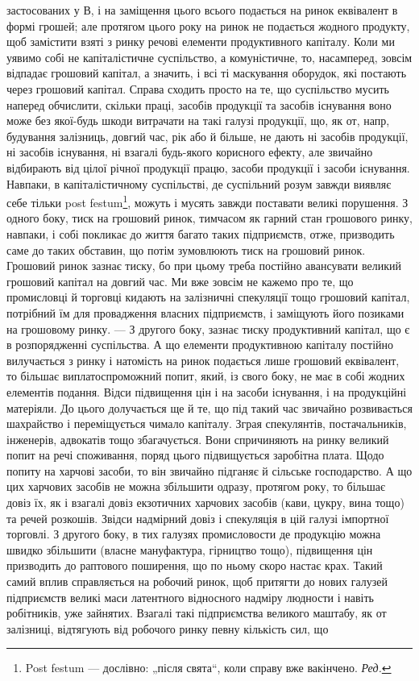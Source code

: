 \parcont{}  %
застосованих у В, і на заміщення цього всього подається на ринок еквівалент
в формі грошей; але протягом цього року на ринок не подається
жодного продукту, щоб замістити взяті з ринку речові елементи продуктивного
капіталу. Коли ми уявимо собі не капіталістичне суспільство,
а комуністичне, то, насамперед, зовсім відпадає грошовий капітал, а значить,
і всі ті маскування оборудок, які постають через грошовий капітал.
Справа сходить просто на те, що суспільство мусить наперед обчислити,
скільки праці, засобів продукції та засобів існування воно може без якої-будь
шкоди витрачати на такі галузі продукції, що, як от, напр, будування
залізниць, довгий час, рік або й більше, не дають ні засобів
продукції, ні засобів існування, ні взагалі будь-якого корисного ефекту,
але звичайно відбирають від цілої річної продукції працю, засоби продукції
і засоби існування. Навпаки, в капіталістичному суспільстві, де
суспільний розум завжди виявляє себе тільки post festum\footnote*{
Post festum — дослівно: „після свята“, коли справу вже вакінчено. \emph{Ред.}
}, можуть і мусять
завжди поставати великі порушення. З одного боку, тиск на грошовий
ринок, тимчасом як гарний стан грошового ринку, навпаки, і собі покликає
до життя багато таких підприємств, отже, призводить саме до таких обставин,
що потім зумовлюють тиск на грошовий ринок. Грошовий ринок
зазнає тиску, бо при цьому треба постійно авансувати великий грошовий
капітал на довгий час. Ми вже зовсім не кажемо про те, що промисловці
й торговці кидають на залізничні спекуляції тощо грошовий капітал,
потрібний їм для провадження власних підприємств, і заміщують його позиками
на грошовому ринку. — З другого боку, зазнає тиску продуктивний капітал,
що є в розпорядженні суспільства. А що елементи продуктивною капіталу
постійно вилучається з ринку і натомість на ринок подається лише
грошовий еквівалент, то більшає виплатоспроможний попит, який, із свого
боку, не має в собі жодних елементів подання. Відси підвищення цін
і на засоби існування, і на продукційні матеріяли. До цього долучається
ще й те, що під такий час звичайно розвивається шахрайство і переміщується
чимало капіталу. Зграя спекулянтів, постачальників, інженерів,
адвокатів тощо збагачується. Вони спричиняють на ринку великий попит
на речі споживання, поряд цього підвищується заробітна плата. Щодо
попиту на харчові засоби, то він звичайно підганяє й сільське господарство.
А що цих харчових засобів не можна збільшити одразу, протягом
року, то більшає довіз їх, як і взагалі довіз екзотичних харчових
засобів (кави, цукру, вина тощо) та речей розкошів. Звідси надмірний
довіз і спекуляція в цій галузі імпортної торговлі. З другого боку, в
тих галузях промисловости де продукцію можна швидко збільшити (власне
мануфактура, гірництво тощо), підвищення цін призводить до раптового
поширення, що по ньому скоро настає крах. Такий самий вплив
справляється на робочий ринок, щоб притягти до нових галузей підприємств
великі маси латентного відносного надміру людности і навіть робітників,
уже зайнятих. Взагалі такі підприємства великого маштабу, як
от залізниці, відтягують від робочого ринку певну кількість сил, що
\parbreak{}  %
